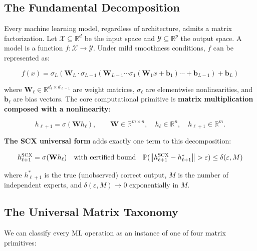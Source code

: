 \documentclass[12pt,a4paper]{article}
\theoremstyle{definition}
\newcommand{\SCX}{\textsc{SCX}}
\newcommand{\R}{\mathbb{R}}
\newcommand{\Pbb}{\mathbb{P}}
\newcommand{\cX}{\mathcal{X}}
\newcommand{\cY}{\mathcal{Y}}
\newcommand{\norm}[1]{\left\lVert#1\right\rVert}
\newcommand{\mat}[1]{\mathbf{#1}}
\begin{document}
\subsection{The Fundamental Decomposition }

Every machine learning model, regardless of architecture, admits a matrix factorization.
Let $\cX \subseteq \R^d$ be the input space and $\cY \subseteq \R^p$ the output space.
A model is a function $f: \cX \to \cY$. Under mild smoothness conditions, $f$ can be
represented as:

\begin{equation}\label{eq:fundamental_decomposition}
    f(x) = \sigma_L(\mat{W}_L \cdot \sigma_{L-1}(\mat{W}_{L-1} \cdots \sigma_1(\mat{W}_1 x + \mat{b}_1) \cdots + \mat{b}_{L-1}) + \mat{b}_L)
\end{equation}

where $\mat{W}_\ell \in \R^{d_\ell \times d_{\ell-1}}$ are weight matrices,
$\sigma_\ell$ are elementwise nonlinearities, and $\mat{b}_\ell$ are bias vectors.
The core computational primitive is \textbf{matrix multiplication composed with a nonlinearity}:

\begin{equation}\label{eq:core_primitive}
    h_{\ell+1} = \sigma(\mat{W} h_\ell), \qquad \mat{W} \in \R^{m \times n}, \quad h_\ell \in \R^n, \quad h_{\ell+1} \in \R^m.
\end{equation}

\textbf{The SCX universal form} adds exactly one term to this decomposition:

\begin{equation}\label{eq:scx_universal}
    h_{\ell+1}^{\SCX} = \sigma(\mat{W} h_\ell) \quad \text{with certified bound} \quad 
    \Pbb(\norm{h_{\ell+1}^{\SCX} - h_{\ell+1}^*} > \varepsilon) \leq \delta(\varepsilon, M)
\end{equation}

where $h_{\ell+1}^*$ is the true (unobserved) correct output, $M$ is the number of independent
experts, and $\delta(\varepsilon, M) \to 0$ exponentially in $M$.

\subsection{The Universal Matrix Taxonomy }

We can classify every ML operation as an instance of one of four matrix primitives:
\end{document}
